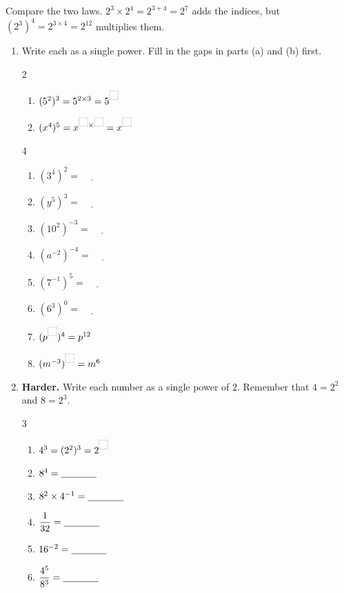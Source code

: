 \documentclass[12pt,a4paper]{article}
\newcommand{\ansline}[1][2.2cm]{\underline{\hspace{#1}}}
\newcommand{\boxgap}[1][9pt]{\tikz[baseline=-0.8pt]\draw[gray!60,densely dotted,thick]
  (0,0) rectangle (#1,#1);}
\begin{document}
\begin{warning}
Compare the two laws. $2^3\times2^4=2^{3+4}=2^7$ adds the indices, but
$(2^3)^4=2^{3\times4}=2^{12}$ multiplies them.
\end{warning}

\begin{enumerate}[resume]

\item Write each as a single power. Fill in the gaps in parts (a) and (b) first.
\begin{multicols}{2}
\begin{enumerate}
  \item $(5^2)^3=5^{2\times3}=5^{\boxgap}$
  \item $(x^4)^5=x^{\boxgap\times\boxgap}=x^{\boxgap}$
\end{enumerate}
\end{multicols}
\begin{multicols}{4}
\begin{enumerate}[start=3,itemsep=14pt]
  \item $(3^4)^2=\ansline[1cm]$
  \item $(y^5)^3=\ansline[1cm]$
  \item $(10^2)^{-3}=\ansline[1cm]$
  \item $(a^{-2})^{-4}=\ansline[1cm]$
  \item $(7^{-1})^5=\ansline[1cm]$
  \item $(6^3)^0=\ansline[1cm]$
  \item $(p^{\boxgap})^4=p^{12}$
  \item $(m^{-3})^{\boxgap}=m^6$
\end{enumerate}
\end{multicols}

\item \textbf{Harder.} Write each number as a single power of $2$. Remember
that $4=2^2$ and $8=2^3$.
\begin{multicols}{3}
\begin{enumerate}[itemsep=12pt]
  \item $4^3=(2^2)^3=2^{\boxgap}$
  \item $8^4=\ansline[1.3cm]$
  \item $8^2\times4^{-1}=\ansline[1.3cm]$
  \item $\dfrac{1}{32}=\ansline[1.3cm]$
  \item $16^{-2}=\ansline[1.3cm]$
  \item $\dfrac{4^5}{8^3}=\ansline[1.3cm]$
\end{enumerate}
\end{multicols}

\end{enumerate}
\end{document}
